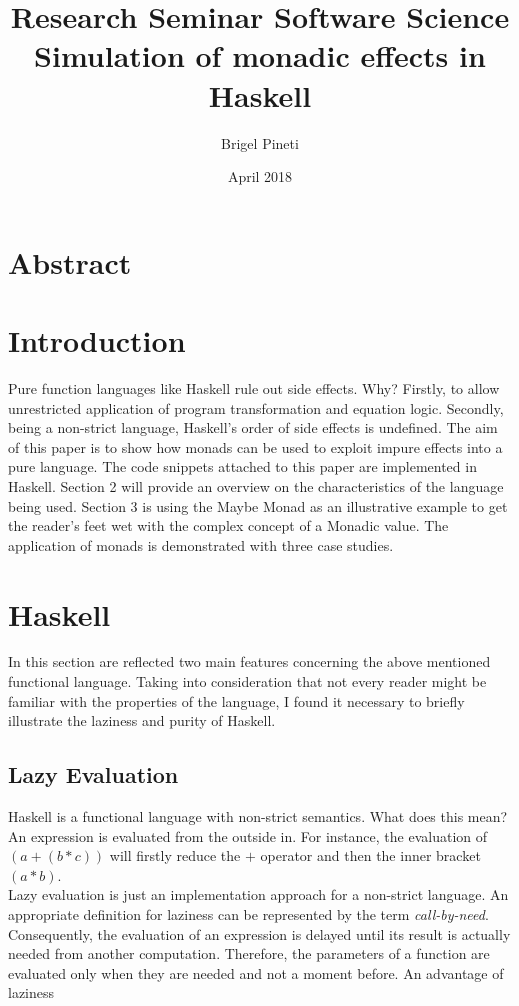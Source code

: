 \documentclass[a4paper, onecolumn]{article}
\title{\Large{Research Seminar Software Science} \\
\huge{Simulation of monadic effects in Haskell}}
\author{Brigel Pineti}
\date{April 2018}
\begin{document}
\maketitle

\section*{Abstract}

\section{Introduction}

Pure function languages like Haskell rule out side effects. Why? Firstly, to allow unrestricted application of program transformation and equation logic. Secondly, being a non-strict language, Haskell's order of side effects is undefined. The aim of this paper is to show how monads can be used to exploit impure effects into a pure language. The code snippets attached to this paper are implemented in Haskell. Section 2 will provide an overview on the characteristics of the language being used. Section 3 is using the Maybe Monad as an illustrative example to get the reader's feet wet with the complex concept of a Monadic value. The application of monads is demonstrated with three case studies.

\section{Haskell}

In this section are reflected two main features concerning the above mentioned functional language. Taking into consideration that not every reader might be familiar with the properties of the language, I found it necessary to briefly illustrate the laziness and purity of Haskell.  

\subsection{Lazy Evaluation}

Haskell is a functional language with non-strict semantics. What does this mean? An expression is evaluated from the outside in. For instance, the evaluation of \textit{$(a + (b * c))$} will firstly reduce the \textit{$+$} operator and then the inner bracket \textit{$(a * b)$}. \\
Lazy evaluation is just an implementation approach for a non-strict language. An appropriate definition for laziness can be represented by the term \textit{call-by-need}. Consequently, the evaluation of an expression is delayed until its result is actually needed from another computation. Therefore, the parameters of a function are evaluated only when they are needed and not a moment before. An advantage of laziness 
\end{document}
